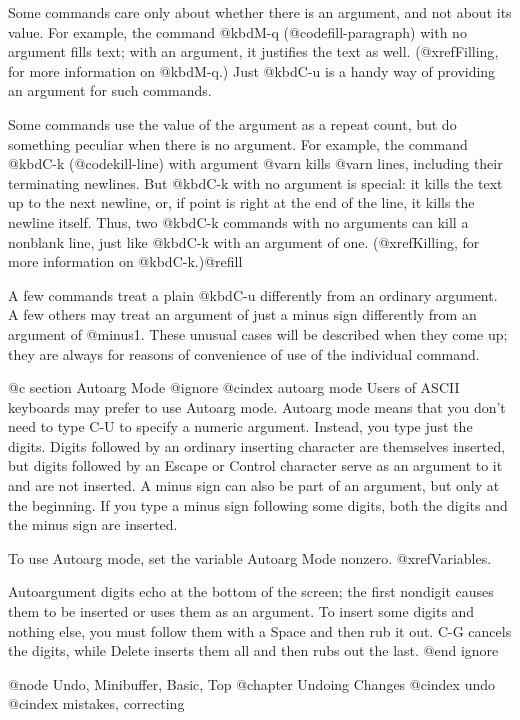 {{{{{{  Some commands care only about whether there is an argument, and not about
its value.  For example, the command @kbd{M-q} (@code{fill-paragraph}) with
no argument fills text; with an argument, it justifies the text as well.
(@xref{Filling}, for more information on @kbd{M-q}.)  Just @kbd{C-u} is a
handy way of providing an argument for such commands.

  Some commands use the value of the argument as a repeat count, but do
something peculiar when there is no argument.  For example, the command
@kbd{C-k} (@code{kill-line}) with argument @var{n} kills @var{n} lines,
including their terminating newlines.  But @kbd{C-k} with no argument is
special: it kills the text up to the next newline, or, if point is right at
the end of the line, it kills the newline itself.  Thus, two @kbd{C-k}
commands with no arguments can kill a nonblank line, just like @kbd{C-k}
with an argument of one.  (@xref{Killing}, for more information on
@kbd{C-k}.)@refill

  A few commands treat a plain @kbd{C-u} differently from an ordinary
argument.  A few others may treat an argument of just a minus sign
differently from an argument of @minus{}1.  These unusual cases will be described
when they come up; they are always for reasons of convenience of use of the
individual command.

@c section Autoarg Mode
@ignore
@cindex autoarg mode
  Users of ASCII keyboards may prefer to use Autoarg mode.  Autoarg mode
means that you don't need to type C-U to specify a numeric argument.
Instead, you type just the digits.  Digits followed by an ordinary
inserting character are themselves inserted, but digits followed by an
Escape or Control character serve as an argument to it and are not
inserted.  A minus sign can also be part of an argument, but only at the
beginning.  If you type a minus sign following some digits, both the digits
and the minus sign are inserted.

  To use Autoarg mode, set the variable Autoarg Mode nonzero.
@xref{Variables}.

  Autoargument digits echo at the bottom of the screen; the first nondigit
causes them to be inserted or uses them as an argument.  To insert some
digits and nothing else, you must follow them with a Space and then rub it
out.  C-G cancels the digits, while Delete inserts them all and then rubs
out the last.
@end ignore

@node Undo, Minibuffer, Basic, Top
@chapter Undoing Changes
@cindex undo
@cindex mistakes, correcting

}}}}}}
